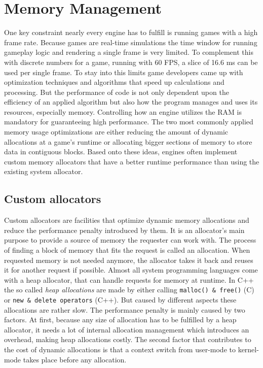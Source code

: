 \section{Memory Management} \label{mem_theory}

One key constraint nearly every engine has to fulfill is running games with a high frame rate. Because games are real-time simulations the time window for running gameplay logic and rendering a single frame is very limited. To complement this with discrete numbers for a game, running with 60 \ac{FPS}, a slice of 16.6 ms can be used per single frame. To stay into this limits game developers came up with optimization techniques and algorithms that speed up calculations and processing. But the performance of code is not only dependent upon the efficiency of an applied algorithm but also how the program manages and uses its resources, especially memory. Controlling how an engine utilizes the \ac{RAM} is mandatory for guaranteeing high performance. The two most commonly applied memory usage optimizations are either reducing the amount of dynamic allocations at a game's runtime or allocating bigger sections of memory to store data in contiguous blocks. Based onto these ideas, engines often implement custom memory allocators that have a better runtime performance than using the existing system allocator.

\subsection{Custom allocators}

Custom allocators are facilities that optimize dynamic memory allocations and reduce the performance penalty introduced by them. It is an allocator's main purpose to provide a source of memory the requester can work with. The process of finding a block of memory that fits the request is called an allocation. When requested memory is not needed anymore, the allocator takes it back and reuses it for another request if possible.
Almost all system programming languages come with a heap allocator, that can handle requests for memory at runtime. In C++ the so called \textit{heap allocations} are made by either calling \texttt{malloc() \& free()} (C) or \texttt{new \& delete operators} (C++). But caused by different aspects these allocations are rather slow. The performance penalty is mainly caused by two factors. At first, because any size of allocation has to be fulfilled by a heap allocator, it needs a lot of internal allocation management which introduces an overhead, making heap allocations costly. The second factor that contributes to the cost of dynamic allocations is that a context switch from user-mode to kernel-mode takes place before any allocation. 

